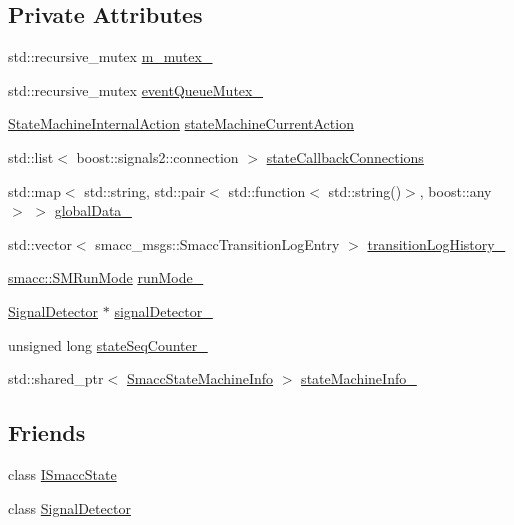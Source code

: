 \subsection*{Private Attributes}
\begin{DoxyCompactItemize}
\item 
std\+::recursive\+\_\+mutex \hyperlink{classsmacc_1_1ISmaccStateMachine_aac785541646e5c517273bf31072505a1}{m\+\_\+mutex\+\_\+}
\item 
std\+::recursive\+\_\+mutex \hyperlink{classsmacc_1_1ISmaccStateMachine_a492facb6acc13cf91c4eaf142abcd871}{event\+Queue\+Mutex\+\_\+}
\item 
\hyperlink{namespacesmacc_a0889aff43c93fe5285109819d2898144}{State\+Machine\+Internal\+Action} \hyperlink{classsmacc_1_1ISmaccStateMachine_a654a98ba86c4c1013ac3c371f293d950}{state\+Machine\+Current\+Action}
\item 
std\+::list$<$ boost\+::signals2\+::connection $>$ \hyperlink{classsmacc_1_1ISmaccStateMachine_aaf98bb0edaa5d8c84767e4acfad3548d}{state\+Callback\+Connections}
\item 
std\+::map$<$ std\+::string, std\+::pair$<$ std\+::function$<$ std\+::string()$>$, boost\+::any $>$ $>$ \hyperlink{classsmacc_1_1ISmaccStateMachine_ad2f9dae184ea942db632ac4532a10a91}{global\+Data\+\_\+}
\item 
std\+::vector$<$ smacc\+\_\+msgs\+::\+Smacc\+Transition\+Log\+Entry $>$ \hyperlink{classsmacc_1_1ISmaccStateMachine_af682d5fce5bb7c959e2b8814dae50023}{transition\+Log\+History\+\_\+}
\item 
\hyperlink{namespacesmacc_a3e4f79486ea6ea6342dd3c712d16a4f6}{smacc\+::\+S\+M\+Run\+Mode} \hyperlink{classsmacc_1_1ISmaccStateMachine_a9f8cfbf577f7ae7a48b7a328e2e6b589}{run\+Mode\+\_\+}
\item 
\hyperlink{classsmacc_1_1SignalDetector}{Signal\+Detector} $\ast$ \hyperlink{classsmacc_1_1ISmaccStateMachine_a3982eb671f5f001cb047d3a467789986}{signal\+Detector\+\_\+}
\item 
unsigned long \hyperlink{classsmacc_1_1ISmaccStateMachine_ab41ee07d20715142e2f7c92d551b2bd6}{state\+Seq\+Counter\+\_\+}
\item 
std\+::shared\+\_\+ptr$<$ \hyperlink{classsmacc_1_1introspection_1_1SmaccStateMachineInfo}{Smacc\+State\+Machine\+Info} $>$ \hyperlink{classsmacc_1_1ISmaccStateMachine_a0914aa27c3f51374c338d89a32b135d1}{state\+Machine\+Info\+\_\+}
\end{DoxyCompactItemize}
\subsection*{Friends}
\begin{DoxyCompactItemize}
\item 
class \hyperlink{classsmacc_1_1ISmaccStateMachine_ab907e4cdbf326246355f56640780162e}{I\+Smacc\+State}
\item 
class \hyperlink{classsmacc_1_1ISmaccStateMachine_a9fb9044f83e768849d1b42d9d0d5508e}{Signal\+Detector}
\end{DoxyCompactItemize}


